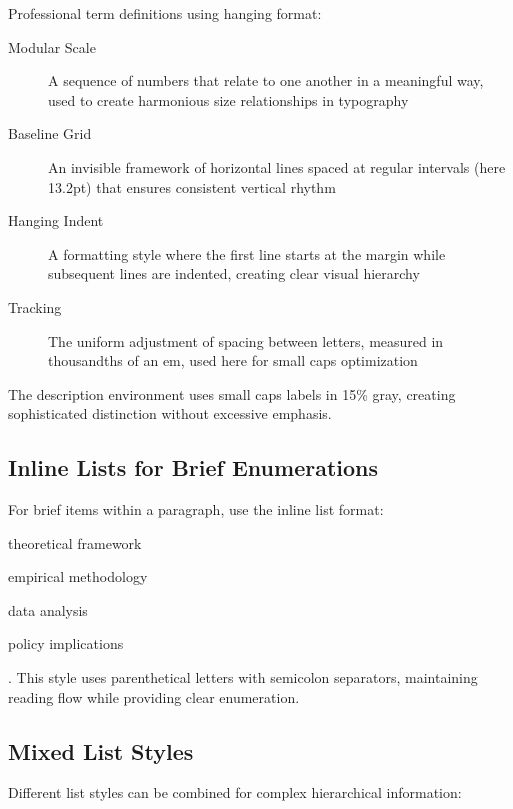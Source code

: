 \documentclass[11pt]{article}
\begin{document}
Professional term definitions using hanging format:

\begin{description}
\item[Modular Scale] A sequence of numbers that relate to one another in a meaningful way, used to create harmonious size relationships in typography
\item[Baseline Grid] An invisible framework of horizontal lines spaced at regular intervals (here 13.2pt) that ensures consistent vertical rhythm
\item[Hanging Indent] A formatting style where the first line starts at the margin while subsequent lines are indented, creating clear visual hierarchy
\item[Tracking] The uniform adjustment of spacing between letters, measured in thousandths of an em, used here for small caps optimization
\end{description}

The description environment uses small caps labels in 15\% gray, creating sophisticated distinction without excessive emphasis.

\subsection{Inline Lists for Brief Enumerations}

For brief items within a paragraph, use the inline list format: \begin{inlineitem}\item theoretical framework\item empirical methodology\item data analysis\item policy implications\end{inlineitem}. This style uses parenthetical letters with semicolon separators, maintaining reading flow while providing clear enumeration.

\subsection{Mixed List Styles}

Different list styles can be combined for complex hierarchical information:
\end{document}
